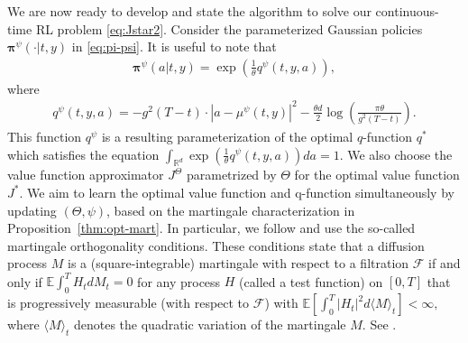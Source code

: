 \documentclass[11pt]{article}
\newcommand{\bpi}{\boldsymbol{\pi}}
\begin{document}
We are now ready to develop and state the algorithm to solve our continuous-time RL problem \eqref{eq:Jstar2}.
Consider the parameterized Gaussian policies $\bpi^{\psi}(\cdot|t,y)$ in \eqref{eq:pi-psi}.
It is useful to note that
\begin{align} \label{eq:pi-psi_q}
\bpi^{\psi} (a| t, y) = \exp \left( \frac{1}{\theta} q^{\psi}(t, y, a) \right),
\end{align}
where
 \begin{align}\label{eq:q-psi}
q^{\psi}(t, y, a) = - g^2(T-t) \cdot |a - \mu^{\psi}(t,y)|^2 - \frac{\theta d}{2} \log \left(\frac{ \pi \theta }{g^2(T-t)} \right).
\end{align}
This function $q^{\psi}$ is a resulting parameterization  of the optimal $q$-function $q^*$  which satisfies the equation $\int_{\mathbb{R}^d} \exp \left( \frac{1}{\theta} q^{\psi}(t, y, a) \right) da =1$.
We also choose the value function approximator $J^{\Theta}$ parametrized by $\Theta$ for the optimal value function $J^*$.  We aim to learn the optimal value function and q-function simultaneously by updating $(\Theta,\psi)$,  based on the martingale characterization in Proposition~\ref{thm:opt-mart}. 
In particular, we follow \cite{jia2023q} and use the so-called martingale orthogonality conditions. These conditions state that a diffusion process $M$ is a (square-integrable) martingale with respect to a filtration $\mathcal{F}$ if and only if $\mathbb{E} \int_0^T H_t dM_t =0$ for any process $H$ (called a test function) on $[0,T]$ that is progressively measurable (with respect to $\mathcal{F}$) with $\mathbb{E}[\int_0^T |H_t|^2 d \langle M \rangle_t] < \infty,$ where $\langle M \rangle_t$ denotes the quadratic variation of the martingale $M$. See \cite[Section 4.2]{JZ21}.
\end{document}
